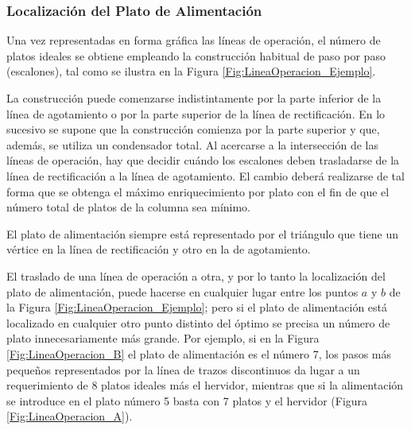 \documentclass[11pt]{book}
\begin{document}
\subsubsection{Localización del Plato de Alimentación}

Una vez representadas en forma gráfica las líneas de operación, el número de platos ideales se obtiene empleando la construcción habitual de paso por paso (escalones), tal como se ilustra en la Figura \ref{Fig:LineaOperacion_Ejemplo}.

La construcción puede comenzarse indistintamente por la parte inferior de la línea de agotamiento o por la parte superior de la línea de rectificación. En lo sucesivo se supone que la construcción comienza por la parte superior y que, además, se utiliza un condensador total. Al acercarse a la intersección de las líneas de operación, hay que decidir cuándo los escalones deben trasladarse de la línea de rectificación a la línea de agotamiento. El cambio deberá realizarse de tal forma que se obtenga el máximo enriquecimiento por plato con el fin de que el número total de platos de la columna sea mínimo.

El plato de alimentación siempre está representado por el triángulo que tiene un vértice en la línea de rectificación y otro en la de agotamiento. 

El traslado de una línea de operación a otra, y por lo tanto la localización del plato de alimentación, puede hacerse en cualquier lugar entre los puntos $a$ y $b$ de la Figura \ref{Fig:LineaOperacion_Ejemplo}; pero si el plato de alimentación está localizado en cualquier otro punto distinto del óptimo se precisa un número de plato innecesariamente más grande. Por ejemplo, si en la Figura \ref{Fig:LineaOperacion_B} el plato de alimentación es el número 7, los pasos más pequeños representados por la línea de trazos discontinuos da lugar a un requerimiento de 8 platos ideales más el hervidor, mientras que si la alimentación se introduce en el plato número 5 basta con 7 platos y el hervidor (Figura \ref{Fig:LineaOperacion_A}).
\end{document}
